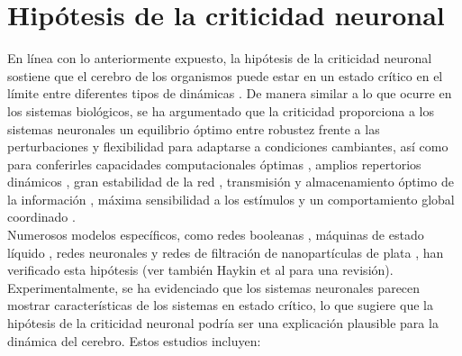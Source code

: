 \section{Hipótesis de la criticidad neuronal}
En línea con lo anteriormente expuesto, la hipótesis de la criticidad neuronal sostiene que el cerebro de los organismos puede estar en un estado crítico en el límite entre diferentes tipos de dinámicas \cite{hesse_self-organized_2014}.  De manera similar a lo que ocurre en los sistemas biológicos, se ha argumentado que la criticidad proporciona a los sistemas neuronales un equilibrio óptimo entre robustez frente a las perturbaciones y flexibilidad para adaptarse a condiciones cambiantes, así como para conferirles capacidades computacionales óptimas \cite{legenstein_edge_2007,tagliazucchi_signatures_2017}, amplios repertorios dinámicos \cite{shew_neuronal_2009}, gran estabilidad de la red \cite{bertschinger_real-time_2004}, transmisión y almacenamiento óptimo de la información \cite{plenz_organizing_2007,beggs_criticality_2007,haldeman_critical_2005,lombardi_balance_2012,vazquez-rodriguez_stochastic_2017}, máxima sensibilidad a los estímulos \cite{kinouchi_optimal_2006,liu_plasticity_2015}  y un comportamiento global coordinado \cite{schneidman_weak_2006,beggs_neuronal_2003}.\\

Numerosos modelos específicos, como redes booleanas \cite{kauffman_emergent_1984,derrida_random_1986}, máquinas de estado líquido \cite{langton_computation_1990}, redes neuronales y redes de filtración de nanopartículas de plata \cite{carstens_brain-like_2022} , han verificado esta hipótesis (ver también Haykin et al \cite{haykin_what_2007} para una revisión). \\

Experimentalmente, se ha evidenciado que los sistemas neuronales parecen mostrar características de los sistemas en estado crítico, lo que sugiere que la hipótesis de la criticidad neuronal podría ser una explicación plausible para la dinámica del cerebro. Estos estudios incluyen:

